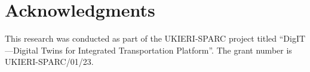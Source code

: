 \section{Acknowledgments}
This research was conducted as part of the UKIERI-SPARC project titled “DigIT—Digital Twins for Integrated Transportation Platform”. The grant number is UKIERI-SPARC/01/23.